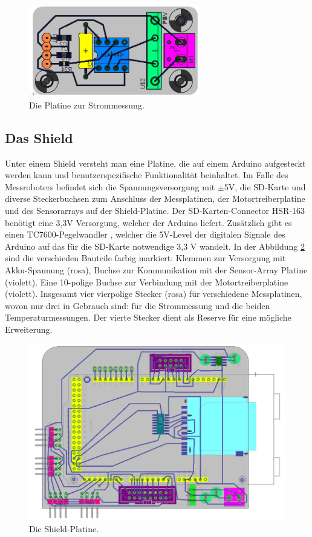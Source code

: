 \documentclass[a4paper,bibtotoc,oneside]{scrbook}
\begin{document}
\begin{figure}[htbp]
\centering
\includegraphics[width=75mm]{img/i2.png}
\caption{Die Platine zur Strommessung.}\label{i2}
\end{figure}



\subsection{Das Shield}\thispagestyle{empty}
Unter einem Shield versteht man eine Platine, die auf einem Arduino aufgesteckt werden kann und benutzerspezifische Funktionalität beinhaltet. Im Falle des Messroboters befindet sich die Spannungsversorgung mit $\pm$5V, die SD-Karte und diverse Steckerbuchsen zum Anschluss der Messplatinen, der Motortreiberplatine und des Sensorarrays auf der Shield-Platine. 
Der SD-Karten-Connector HSR-163 \cite{hsr} benötigt eine 3,3V Versorgung, welcher der Arduino liefert. 
Zusätzlich gibt es einen TC7600-Pegelwandler \cite{tc7660}, welcher die 5V-Level der digitalen Signale des Arduino auf das für die SD-Karte notwendige 3,3 V wandelt.
In der Abbildung  \ref{shield} sind die verschieden Bauteile farbig markiert:
Klemmen zur Versorgung mit Akku-Spannung (rosa), Buchse zur Kommunikation mit der Sensor-Array Platine (violett). Eine 10-polige Buchse zur Verbindung mit der Motortreiberplatine (violett). Insgesamt vier vierpolige Stecker (rosa) für verschiedene Messplatinen, wovon nur drei in Gebrauch sind: für die Strommessung und die beiden Temperaturmessungen. Der vierte Stecker dient als Reserve für eine mögliche Erweiterung. 

\begin{figure}[htbp]
\centering
\includegraphics[width=125mm]{img/shield.png}
\caption{Die Shield-Platine.}\label{shield}
\end{figure}
\end{document}
